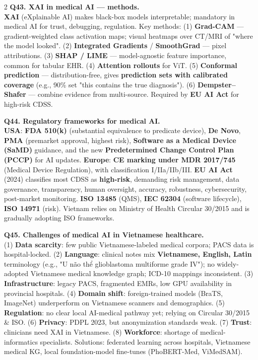 \begin{paracol}{2}
\textbf{Q43. XAI in medical AI — methods.}\\
\textbf{XAI} (eXplainable AI) makes black-box models interpretable; mandatory in medical AI for trust, debugging, regulation. Key methods: (1) \textbf{Grad-CAM} — gradient-weighted class activation maps; visual heatmaps over CT/MRI of "where the model looked". (2) \textbf{Integrated Gradients} / \textbf{SmoothGrad} — pixel attributions. (3) \textbf{SHAP / LIME} — model-agnostic feature importance, common for tabular EHR. (4) \textbf{Attention rollouts} for ViT. (5) \textbf{Conformal prediction} — distribution-free, gives \textbf{prediction sets with calibrated coverage} (e.g., 90\% set "this contains the true diagnosis"). (6) \textbf{Dempster--Shafer} — combine evidence from multi-source. Required by \textbf{EU AI Act} for high-risk CDSS.

\textbf{Q44. Regulatory frameworks for medical AI.}\\
\textbf{USA}: \textbf{FDA 510(k)} (substantial equivalence to predicate device), \textbf{De Novo}, \textbf{PMA} (premarket approval, highest risk), \textbf{Software as a Medical Device (SaMD)} guidance, and the new \textbf{Predetermined Change Control Plan (PCCP)} for AI updates. \textbf{Europe}: \textbf{CE marking under MDR 2017/745} (Medical Device Regulation), with classification I/IIa/IIb/III. \textbf{EU AI Act} (2024) classifies most CDSS as \textbf{high-risk}, demanding risk management, data governance, transparency, human oversight, accuracy, robustness, cybersecurity, post-market monitoring. \textbf{ISO 13485} (QMS), \textbf{IEC 62304} (software lifecycle), \textbf{ISO 14971} (risk). Vietnam relies on Ministry of Health Circular 30/2015 and is gradually adopting ISO frameworks.

\textbf{Q45. Challenges of medical AI in Vietnamese healthcare.}\\
(1) \textbf{Data scarcity}: few public Vietnamese-labeled medical corpora; PACS data is hospital-locked. (2) \textbf{Language}: clinical notes mix \textbf{Vietnamese, English, Latin} terminology (e.g., "U não thể glioblastoma multiforme grade IV"); no widely-adopted Vietnamese medical knowledge graph; ICD-10 mappings inconsistent. (3) \textbf{Infrastructure}: legacy PACS, fragmented EMRs, low GPU availability in provincial hospitals. (4) \textbf{Domain shift}: foreign-trained models (BraTS, ImageNet) underperform on Vietnamese scanners and demographics. (5) \textbf{Regulation}: no clear local AI-medical pathway yet; relying on Circular 30/2015 \& ISO. (6) \textbf{Privacy}: PDPL 2023, but anonymization standards weak. (7) \textbf{Trust}: clinicians need XAI in Vietnamese. (8) \textbf{Workforce}: shortage of medical-informatics specialists. Solutions: federated learning across hospitals, Vietnamese medical KG, local foundation-model fine-tunes (PhoBERT-Med, ViMedSAM).


\end{paracol}
